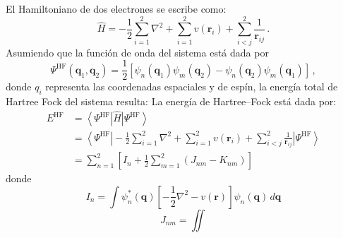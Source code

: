 \documentclass[10pt]{article}
\begin{document}
\vspace{0.25cm}
El Hamiltoniano de dos electrones se escribe como:
\begin{equation}
 \hat{H} = -\frac{1}{2}\sum_{i=1}^2 \nabla^2 + \sum_{i=1}^2 v(\mathbf{r}_i) 
 + \sum_{i<j}^2 \frac{1}{\mathbf{r}_{ij}}\,.
\end{equation}
Asumiendo que la función de onda del sistema está dada por
\begin{equation}
 \Psi^{\mathrm{HF}}(\mathbf{q}_1,\mathbf{q}_2)=\frac{1}{2}\left[
 \psi_n(\mathbf{q}_1)\psi_m(\mathbf{q}_2)-\psi_n(\mathbf{q}_2)\psi_m(\mathbf{q}_1)
 \right]\,,
\end{equation}
donde $q_i$ representa las coordenadas espaciales y de espín, 
la energía total de Hartree Fock del sistema resulta:
La energía de Hartree--Fock está dada por:
\begin{align}
 E^{\mathrm{HF}}
 &=\left<\Psi^{\mathrm{HF}}\right|\hat{H}\left|\Psi^{\mathrm{HF}}\right> \\
 &=\left<\Psi^{\mathrm{HF}}\right| -\frac{1}{2}\sum_{i=1}^2 \nabla^2 + \sum_{i=1}^2 v(\mathbf{r}_i) 
 + \sum_{i<j}^2 \frac{1}{\mathbf{r}_{ij}} \left|\Psi^{\mathrm{HF}}\right> \\
 &=\sum_{n=1}^2 \left[ I_n 
 + \frac{1}{2} \sum_{m=1}^{2}\left(J_{nm}-K_{nm}\right) \right] 
\end{align}
donde 
\begin{equation}
 I_n=\int\psi_n^*(\mathbf{q})\left[-\frac{1}{2}\nabla^2-v(\mathbf{r})\right]\psi_n(\mathbf{q}) \,d\mathbf{q}
\end{equation}
\begin{equation}
 J_{nm}=\iint 
\end{equation}
\end{document}
